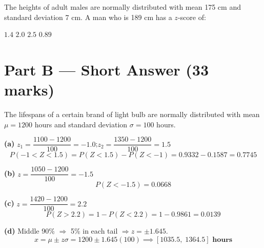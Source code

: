 \documentclass[addpoints]{exam}
\begin{document}
\begin{questions}
\question[1] The heights of adult males are normally distributed with mean 175 cm and
standard deviation 7 cm. A man who is 189 cm has a $z$-score of:
\begin{choices}
    \choice $1.4$
    \correctchoice $2.0$
    \choice $2.5$
    \choice $0.89$
\end{choices}


\section*{Part B --- Short Answer (33 marks)}

\question The lifespans of a certain brand of light bulb are normally distributed with
mean $\mu = 1200$ hours and standard deviation $\sigma = 100$ hours.
\begin{solution}[10cm]
\textbf{(a)} $z_1 = \dfrac{1100-1200}{100} = -1.0$;\quad $z_2 = \dfrac{1350-1200}{100} = 1.5$
\[
P(-1<Z<1.5) = P(Z<1.5) - P(Z<-1) = 0.9332 - 0.1587 = \mathbf{0.7745}
\]

\textbf{(b)} $z = \dfrac{1050-1200}{100} = -1.5$
\[
P(Z < -1.5) = \mathbf{0.0668}
\]

\textbf{(c)} $z = \dfrac{1420-1200}{100} = 2.2$
\[
P(Z > 2.2) = 1 - P(Z < 2.2) = 1 - 0.9861 = \mathbf{0.0139}
\]

\textbf{(d)} Middle 90\% $\Rightarrow$ 5\% in each tail $\Rightarrow z = \pm 1.645$.
\[
x = \mu \pm z\sigma = 1200 \pm 1.645(100) \implies \mathbf{[1035.5,\; 1364.5] \text{ hours}}
\]
\end{solution}


\end{questions}
\end{document}
